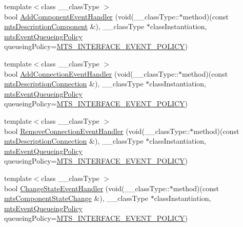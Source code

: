 \begin{DoxyCompactItemize}
\item 
{\footnotesize template$<$class \+\_\+\+\_\+class\+Type $>$ }\\bool \hyperlink{classmts_manager_component_services_aac555ce8c3bc4017ccbd8bb1d6aa40ad}{Add\+Component\+Event\+Handler} (void(\+\_\+\+\_\+class\+Type\+::$\ast$method)(const \hyperlink{classmts_description_component}{mts\+Description\+Component} \&), \+\_\+\+\_\+class\+Type $\ast$class\+Instantiation, \hyperlink{mts_forward_declarations_8h_a9286ac2ca46e5bcd57059550faa96916}{mts\+Event\+Queueing\+Policy} queueing\+Policy=\hyperlink{mts_forward_declarations_8h_a9286ac2ca46e5bcd57059550faa96916a3d4338e85690d50e9ab167be77cdefa0}{M\+T\+S\+\_\+\+I\+N\+T\+E\+R\+F\+A\+C\+E\+\_\+\+E\+V\+E\+N\+T\+\_\+\+P\+O\+L\+I\+C\+Y})
\item 
{\footnotesize template$<$class \+\_\+\+\_\+class\+Type $>$ }\\bool \hyperlink{classmts_manager_component_services_a36c0cf4ae83f2f64ff73a48ad6f48216}{Add\+Connection\+Event\+Handler} (void(\+\_\+\+\_\+class\+Type\+::$\ast$method)(const \hyperlink{classmts_description_connection}{mts\+Description\+Connection} \&), \+\_\+\+\_\+class\+Type $\ast$class\+Instantiation, \hyperlink{mts_forward_declarations_8h_a9286ac2ca46e5bcd57059550faa96916}{mts\+Event\+Queueing\+Policy} queueing\+Policy=\hyperlink{mts_forward_declarations_8h_a9286ac2ca46e5bcd57059550faa96916a3d4338e85690d50e9ab167be77cdefa0}{M\+T\+S\+\_\+\+I\+N\+T\+E\+R\+F\+A\+C\+E\+\_\+\+E\+V\+E\+N\+T\+\_\+\+P\+O\+L\+I\+C\+Y})
\item 
{\footnotesize template$<$class \+\_\+\+\_\+class\+Type $>$ }\\bool \hyperlink{classmts_manager_component_services_a87f6e1aa2352935f3b913691e4eec55d}{Remove\+Connection\+Event\+Handler} (void(\+\_\+\+\_\+class\+Type\+::$\ast$method)(const \hyperlink{classmts_description_connection}{mts\+Description\+Connection} \&), \+\_\+\+\_\+class\+Type $\ast$class\+Instantiation, \hyperlink{mts_forward_declarations_8h_a9286ac2ca46e5bcd57059550faa96916}{mts\+Event\+Queueing\+Policy} queueing\+Policy=\hyperlink{mts_forward_declarations_8h_a9286ac2ca46e5bcd57059550faa96916a3d4338e85690d50e9ab167be77cdefa0}{M\+T\+S\+\_\+\+I\+N\+T\+E\+R\+F\+A\+C\+E\+\_\+\+E\+V\+E\+N\+T\+\_\+\+P\+O\+L\+I\+C\+Y})
\item 
{\footnotesize template$<$class \+\_\+\+\_\+class\+Type $>$ }\\bool \hyperlink{classmts_manager_component_services_a1f6ea6e32a98f6e314b52f9d9d594e06}{Change\+State\+Event\+Handler} (void(\+\_\+\+\_\+class\+Type\+::$\ast$method)(const \hyperlink{classmts_component_state_change}{mts\+Component\+State\+Change} \&), \+\_\+\+\_\+class\+Type $\ast$class\+Instantiation, \hyperlink{mts_forward_declarations_8h_a9286ac2ca46e5bcd57059550faa96916}{mts\+Event\+Queueing\+Policy} queueing\+Policy=\hyperlink{mts_forward_declarations_8h_a9286ac2ca46e5bcd57059550faa96916a3d4338e85690d50e9ab167be77cdefa0}{M\+T\+S\+\_\+\+I\+N\+T\+E\+R\+F\+A\+C\+E\+\_\+\+E\+V\+E\+N\+T\+\_\+\+P\+O\+L\+I\+C\+Y})
\end{DoxyCompactItemize}

